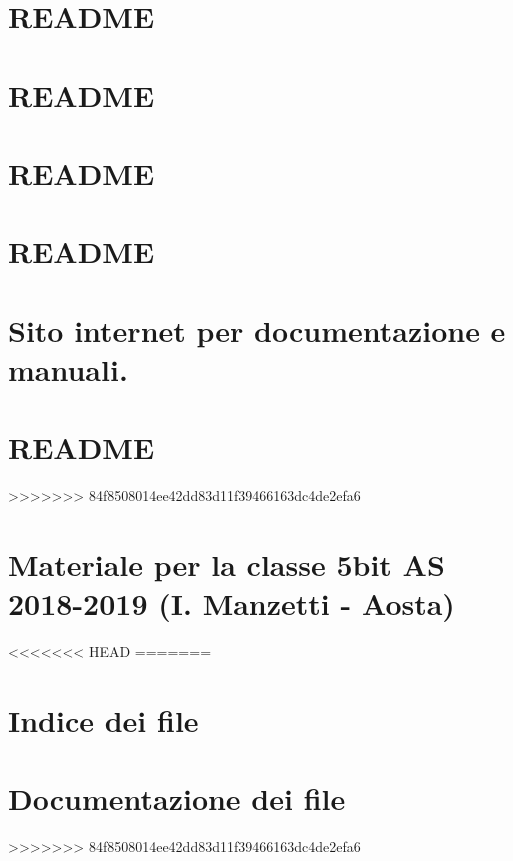 \documentclass[twoside]{book}
\newcommand{\+}{\discretionary{\mbox{\scriptsize$\hookleftarrow$}}{}{}}
\newcommand{\clearemptydoublepage}{%
  \newpage{\pagestyle{empty}\cleardoublepage}%
}
\begin{document}
\chapter{R\+E\+A\+D\+ME}
\label{md_manuali_sito_etc_README}

\chapter{R\+E\+A\+D\+ME}
\label{md_manuali_sito_images_README}

\chapter{R\+E\+A\+D\+ME}
\label{md_manuali_sito_js_README}

\chapter{R\+E\+A\+D\+ME}
\label{md_manuali_sito_lib_README}

\chapter{Sito internet per documentazione e manuali.}
\label{md_manuali_sito_README}

\chapter{R\+E\+A\+D\+ME}
\label{md_manuali_sito_sub_README}

>>>>>>> 84f8508014ee42dd83d11f39466163dc4de2efa6
\chapter{Materiale per la classe 5bit AS 2018-\/2019 (I. Manzetti -\/ Aosta)}
\label{md_README}

<<<<<<< HEAD
=======
\chapter{Indice dei file}

\chapter{Documentazione dei file}
















>>>>>>> 84f8508014ee42dd83d11f39466163dc4de2efa6

\backmatter
\newpage
{}
\clearemptydoublepage
{}
\printindex
\end{document}
